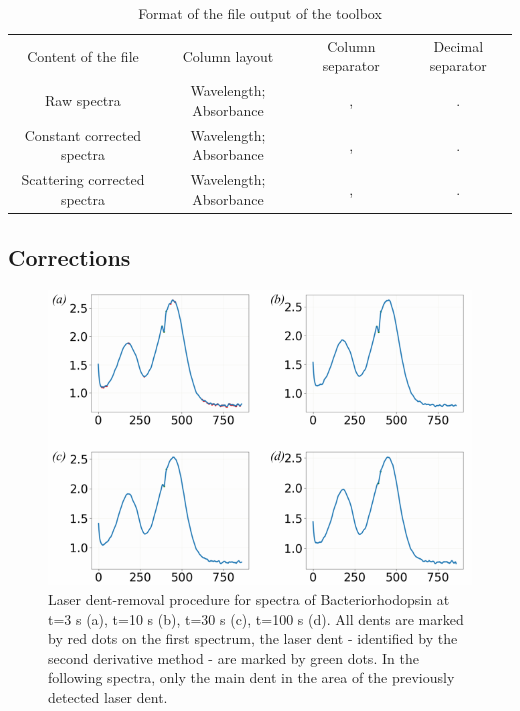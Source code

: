 \begin{table}
    \centering
\caption{Format of the file output of the toolbox}
\label{tab:formats_outputs}
    \begin{tabular}{cccc}
         Content of the file & Column layout & Column separator & Decimal separator\\
         Raw spectra & Wavelength; Absorbance & , & .\\
         Constant corrected spectra & Wavelength; Absorbance & , & .\\
         Scattering corrected spectra & Wavelength; Absorbance & , & .\\
    \end{tabular}
    
    
\end{table}

\subsection{Corrections}

\begin{figure}[H] %
    \centering
    \noindent \includegraphics[width=\textwidth]{images/Spectroscopy/icOS_toolbox_FigS3.pdf}
    \hfill
    \caption{Laser dent-removal procedure for spectra of Bacteriorhodopsin at t=3 \textmu s (a), t=10 \textmu s (b), t=30 \textmu s (c), t=100 \textmu s (d). All dents are marked by red dots on the first spectrum, the laser dent - identified by the second derivative method - are marked by green dots. In the following spectra, only the main dent in the area of the previously detected laser dent. }
    \label{supfig:laserdent}
\end{figure}

